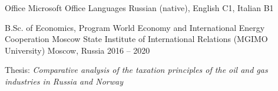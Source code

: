 \documentclass[11pt, a4paper]{awesome-cv}
\begin{document}
\begin{cvskills}
	\cvskill
		{Office}
		{Microsoft Office}
	\cvskill
		{Languages}
		{Russian (native), English C1, Italian B1}
\end{cvskills}

\begin{cventries}
	
\cventry
	{B.Sc. of Economics, Program World Economy and International Energy Cooperation}
	{Moscow State Institute of International Relations (MGIMO University)}
	{Moscow, Russia}
	{2016 -- 2020}
	{
		\begin{cvitems}
			\item {Thesis: \textit{Comparative analysis of the taxation principles of the oil and gas industries in Russia and Norway}}
		\end{cvitems}
	}
	
\end{cventries}








































\end{document}
